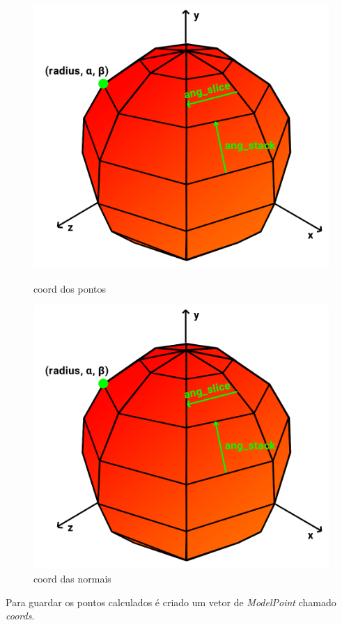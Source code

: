 \documentclass[a4paper]{report}
\begin{document}
\begin{figure}[H]
    \centering
    \begin{minipage}{0.5\textwidth}
        \centering
        \includegraphics[width=\textwidth]{images/sphere_vetores.png}
        \caption{coord dos pontos}
    \end{minipage}\hfill
    \begin{minipage}{0.5\textwidth}
        \centering
        \includegraphics[width=\textwidth]{images/sphere_vetores.png}
        \caption{coord das normais}
    \end{minipage}\hfill
\end{figure}
Para guardar os pontos calculados é criado um vetor de \textit{ModelPoint}
chamado \textit{coords}.
\end{document}
